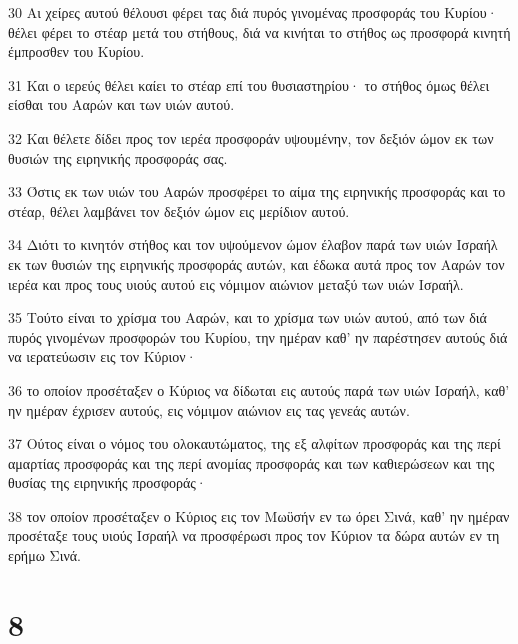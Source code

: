 \par 30 Αι χείρες αυτού θέλουσι φέρει τας διά πυρός γινομένας προσφοράς του Κυρίου· θέλει φέρει το στέαρ μετά του στήθους, διά να κινήται το στήθος ως προσφορά κινητή έμπροσθεν του Κυρίου.
\par 31 Και ο ιερεύς θέλει καίει το στέαρ επί του θυσιαστηρίου· το στήθος όμως θέλει είσθαι του Ααρών και των υιών αυτού.
\par 32 Και θέλετε δίδει προς τον ιερέα προσφοράν υψουμένην, τον δεξιόν ώμον εκ των θυσιών της ειρηνικής προσφοράς σας.
\par 33 Όστις εκ των υιών του Ααρών προσφέρει το αίμα της ειρηνικής προσφοράς και το στέαρ, θέλει λαμβάνει τον δεξιόν ώμον εις μερίδιον αυτού.
\par 34 Διότι το κινητόν στήθος και τον υψούμενον ώμον έλαβον παρά των υιών Ισραήλ εκ των θυσιών της ειρηνικής προσφοράς αυτών, και έδωκα αυτά προς τον Ααρών τον ιερέα και προς τους υιούς αυτού εις νόμιμον αιώνιον μεταξύ των υιών Ισραήλ.
\par 35 Τούτο είναι το χρίσμα του Ααρών, και το χρίσμα των υιών αυτού, από των διά πυρός γινομένων προσφορών του Κυρίου, την ημέραν καθ' ην παρέστησεν αυτούς διά να ιερατεύωσιν εις τον Κύριον·
\par 36 το οποίον προσέταξεν ο Κύριος να δίδωται εις αυτούς παρά των υιών Ισραήλ, καθ' ην ημέραν έχρισεν αυτούς, εις νόμιμον αιώνιον εις τας γενεάς αυτών.
\par 37 Ούτος είναι ο νόμος του ολοκαυτώματος, της εξ αλφίτων προσφοράς και της περί αμαρτίας προσφοράς και της περί ανομίας προσφοράς και των καθιερώσεων και της θυσίας της ειρηνικής προσφοράς·
\par 38 τον οποίον προσέταξεν ο Κύριος εις τον Μωϋσήν εν τω όρει Σινά, καθ' ην ημέραν προσέταξε τους υιούς Ισραήλ να προσφέρωσι προς τον Κύριον τα δώρα αυτών εν τη ερήμω Σινά.

\chapter{8}

